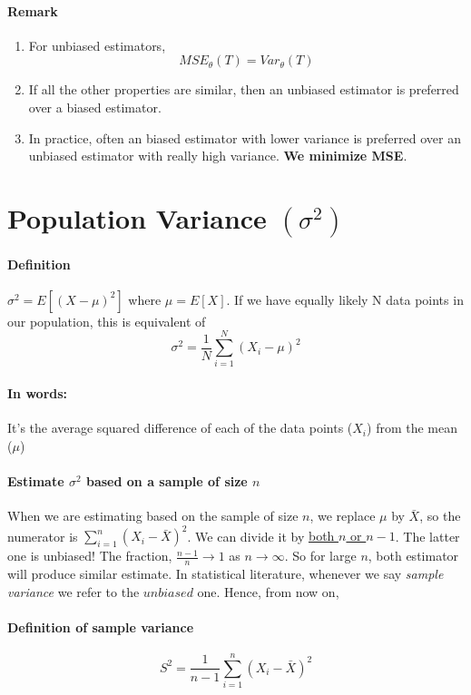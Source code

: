 \documentclass[11pt]{article}
\newcommand{\ti}[1]{\textit{#1}}
\newcommand{\tb}[1]{\textbf{#1}}
\newcommand{\under}[1]{\underline{#1}}
\begin{document}
\paragraph{Remark}
\begin{enumerate}
	\item For unbiased estimators, $$MSE_\theta(T) = Var_\theta(T)$$
	\item If all the other properties are similar, then an unbiased estimator is preferred over a biased estimator.
	\item In practice, often an biased estimator with lower variance is preferred over an unbiased estimator with really high variance. \tb{We minimize MSE}.
\end{enumerate}
\section{Population Variance $(\sigma^2)$}
\paragraph{Definition} $\sigma^2 = E[(X - \mu)^2]$ where $\mu = E[X]$. \newline
If we have equally likely N data points in our population, this is equivalent of $$\sigma^2 = \frac{1}{N}\sum_{i = 1}^N(X_i - \mu)^2$$
\paragraph{In words:} It's the average squared difference of each of the data points ($X_i$) from the mean ($\mu$)
\paragraph{Estimate $\sigma^2$ based on a sample of size $n$}
When we are estimating based on the sample of size $n$, we replace $\mu$ by $\bar X$, so the numerator is $\sum_{i=1}^n(X_i-\bar X)^2$. We can divide it by \under{both $n$ or $n-1$}. The latter one is unbiased! \newline
The fraction, $\frac{n-1}{n} \rightarrow 1$ as $n \rightarrow \infty$. So for large $n$, both estimator will produce similar estimate. In statistical literature, whenever we say \ti{sample variance} we refer to the $unbiased$ one. Hence, from now on,
\paragraph{Definition of sample variance}
$$S^2 = \frac{1}{n-1}\sum_{i=1}^n(X_i - \bar X)^2$$
\end{document}
